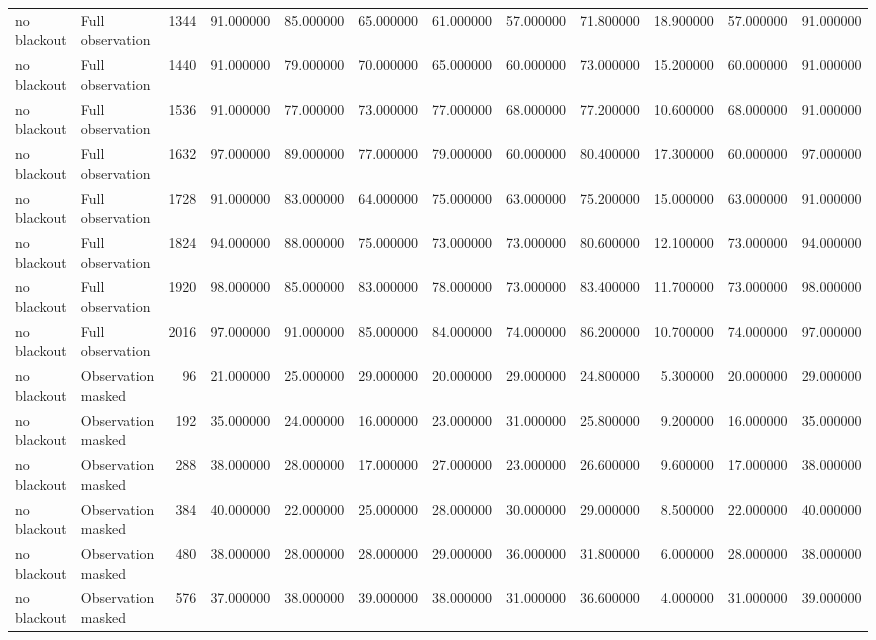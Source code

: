 \begin{tabular}{llrrrrrrrrrr}
no blackout & Full observation & 1344 & 91.000000 & 85.000000 & 65.000000 & 61.000000 & 57.000000 & 71.800000 & 18.900000 & 57.000000 & 91.000000 \\
no blackout & Full observation & 1440 & 91.000000 & 79.000000 & 70.000000 & 65.000000 & 60.000000 & 73.000000 & 15.200000 & 60.000000 & 91.000000 \\
no blackout & Full observation & 1536 & 91.000000 & 77.000000 & 73.000000 & 77.000000 & 68.000000 & 77.200000 & 10.600000 & 68.000000 & 91.000000 \\
no blackout & Full observation & 1632 & 97.000000 & 89.000000 & 77.000000 & 79.000000 & 60.000000 & 80.400000 & 17.300000 & 60.000000 & 97.000000 \\
no blackout & Full observation & 1728 & 91.000000 & 83.000000 & 64.000000 & 75.000000 & 63.000000 & 75.200000 & 15.000000 & 63.000000 & 91.000000 \\
no blackout & Full observation & 1824 & 94.000000 & 88.000000 & 75.000000 & 73.000000 & 73.000000 & 80.600000 & 12.100000 & 73.000000 & 94.000000 \\
no blackout & Full observation & 1920 & 98.000000 & 85.000000 & 83.000000 & 78.000000 & 73.000000 & 83.400000 & 11.700000 & 73.000000 & 98.000000 \\
no blackout & Full observation & 2016 & 97.000000 & 91.000000 & 85.000000 & 84.000000 & 74.000000 & 86.200000 & 10.700000 & 74.000000 & 97.000000 \\
no blackout & Observation masked & 96 & 21.000000 & 25.000000 & 29.000000 & 20.000000 & 29.000000 & 24.800000 & 5.300000 & 20.000000 & 29.000000 \\
no blackout & Observation masked & 192 & 35.000000 & 24.000000 & 16.000000 & 23.000000 & 31.000000 & 25.800000 & 9.200000 & 16.000000 & 35.000000 \\
no blackout & Observation masked & 288 & 38.000000 & 28.000000 & 17.000000 & 27.000000 & 23.000000 & 26.600000 & 9.600000 & 17.000000 & 38.000000 \\
no blackout & Observation masked & 384 & 40.000000 & 22.000000 & 25.000000 & 28.000000 & 30.000000 & 29.000000 & 8.500000 & 22.000000 & 40.000000 \\
no blackout & Observation masked & 480 & 38.000000 & 28.000000 & 28.000000 & 29.000000 & 36.000000 & 31.800000 & 6.000000 & 28.000000 & 38.000000 \\
no blackout & Observation masked & 576 & 37.000000 & 38.000000 & 39.000000 & 38.000000 & 31.000000 & 36.600000 & 4.000000 & 31.000000 & 39.000000 \\

\end{tabular}
